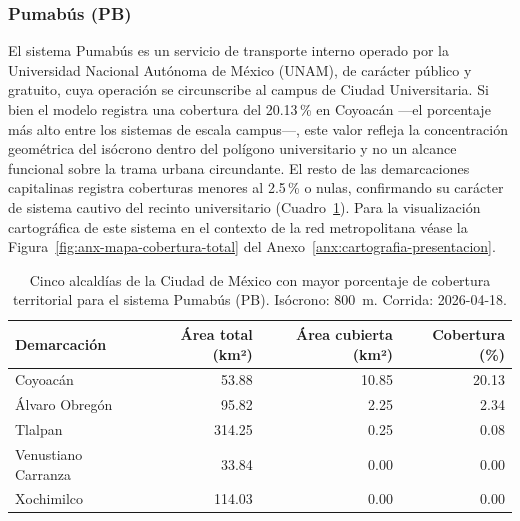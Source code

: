 \subsubsection{Pumabús (PB)}
\label{subsubsec:cobertura-pb}

El sistema Pumabús es un servicio de transporte interno operado por la Universidad
Nacional Autónoma de México (UNAM), de carácter público y gratuito, cuya operación
se circunscribe al campus de Ciudad Universitaria. Si bien el modelo registra una
cobertura del 20.13\,\% en Coyoacán ---el porcentaje más alto entre los sistemas
de escala campus---, este valor refleja la concentración geométrica del isócrono
dentro del polígono universitario y no un alcance funcional sobre la trama urbana
circundante. El resto de las demarcaciones capitalinas registra coberturas menores
al 2.5\,\% o nulas, confirmando su carácter de sistema cautivo del recinto
universitario (Cuadro~\ref{tab:cobertura-pb-cdmx}). Para la visualización
cartográfica de este sistema en el contexto de la red metropolitana véase la
Figura~\ref{fig:anx-mapa-cobertura-total} del
Anexo~\ref{anx:cartografia-presentacion}.

\begin{table}[H]
    \centering
    \caption[Alcaldías con mayor cobertura de Pumabús (CDMX)]{
    Cinco alcaldías de la Ciudad de México con mayor porcentaje de cobertura
    territorial para el sistema Pumabús (PB). Isócrono: 800~m.
    Corrida: 2026-04-18.}
    \label{tab:cobertura-pb-cdmx}
    \begin{tabular}{|l|r|r|r|}
        \hline
        \textbf{Demarcación} & \textbf{Área total (km²)} & \textbf{Área cubierta (km²)} & \textbf{Cobertura (\%)} \\
        \hline
        Coyoacán            &  53.88 & 10.85 &  20.13 \\
        Álvaro Obregón      &  95.82 &  2.25 &   2.34 \\
        Tlalpan             & 314.25 &  0.25 &   0.08 \\
        Venustiano Carranza &  33.84 &  0.00 &   0.00 \\
        Xochimilco          & 114.03 &  0.00 &   0.00 \\
        \hline
    \end{tabular}
\end{table}


